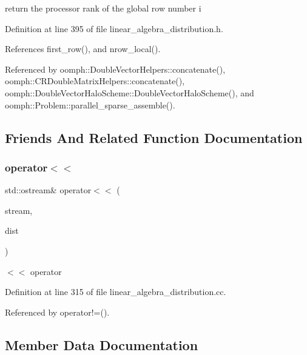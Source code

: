 return the processor rank of the global row number i 



Definition at line 395 of file linear\+\_\+algebra\+\_\+distribution.\+h.



References first\+\_\+row(), and nrow\+\_\+local().



Referenced by oomph\+::\+Double\+Vector\+Helpers\+::concatenate(), oomph\+::\+C\+R\+Double\+Matrix\+Helpers\+::concatenate(), oomph\+::\+Double\+Vector\+Halo\+Scheme\+::\+Double\+Vector\+Halo\+Scheme(), and oomph\+::\+Problem\+::parallel\+\_\+sparse\+\_\+assemble().



\subsection{Friends And Related Function Documentation}
\mbox{\label{classoomph_1_1LinearAlgebraDistribution_a30dc1f50bb5c060c30c94281bcbe6815}} 
\subsubsection{\texorpdfstring{operator$<$$<$}{operator<<}}
{\footnotesize\ttfamily std\+::ostream\& operator$<$$<$ (\begin{DoxyParamCaption}\item[{std\+::ostream \&}]{stream,  }\item[{\hyperlink{classoomph_1_1LinearAlgebraDistribution}{Linear\+Algebra\+Distribution} \&}]{dist }\end{DoxyParamCaption})\hspace{0.3cm}{\ttfamily [friend]}}



$<$$<$ operator 



Definition at line 315 of file linear\+\_\+algebra\+\_\+distribution.\+cc.



Referenced by operator!=().



\subsection{Member Data Documentation}
\mbox{\label{classoomph_1_1LinearAlgebraDistribution_a4ed739bdcab7465b2e7651a9e2a23ed8}} 
